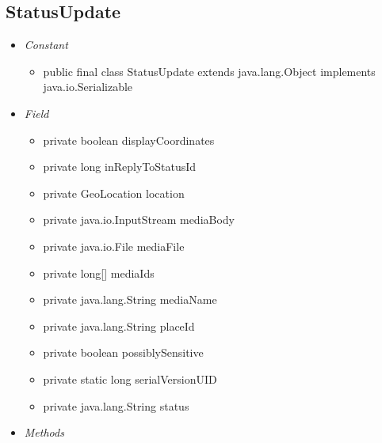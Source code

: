 	\subsection{StatusUpdate}
	\begin{itemize}
		\item \textit{Constant}
		
		\begin{itemize}
			\item public final class StatusUpdate
			extends java.lang.Object
			implements java.io.Serializable
		\end{itemize}
		
		\item \textit{Field}
		
		\begin{itemize}
			\item private boolean displayCoordinates
			\item private long inReplyToStatusId 
			\item private GeoLocation location 
			\item private java.io.InputStream mediaBody 
			\item private java.io.File mediaFile 
			\item private long[] mediaIds 
			\item private java.lang.String mediaName 
			\item private java.lang.String placeId 
			\item private boolean possiblySensitive 
			\item private static long serialVersionUID 
			\item private java.lang.String status 
		\end{itemize}
		\item \textit{Methods}
		

\end{itemize}
